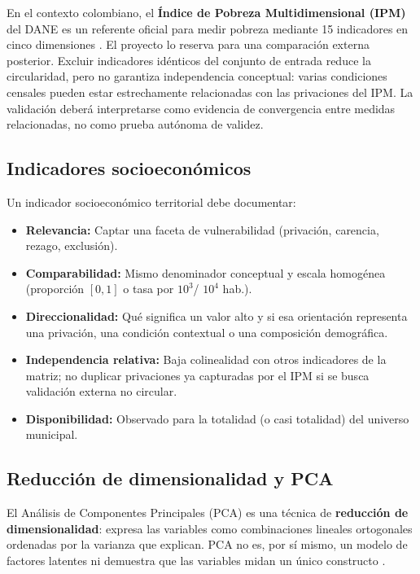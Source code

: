 En el contexto colombiano, el \textbf{Índice de Pobreza Multidimensional (IPM)} del DANE es un referente oficial para medir pobreza mediante 15 indicadores en cinco dimensiones \citep{dane2019ipm}. El proyecto lo reserva para una comparación externa posterior. Excluir indicadores idénticos del conjunto de entrada reduce la circularidad, pero no garantiza independencia conceptual: varias condiciones censales pueden estar estrechamente relacionadas con las privaciones del IPM. La validación deberá interpretarse como evidencia de convergencia entre medidas relacionadas, no como prueba autónoma de validez.

\subsection{Indicadores socioeconómicos}
\label{sec:indicadores_conceptual}

Un indicador socioeconómico territorial debe documentar:

\begin{itemize}
    \item \textbf{Relevancia:} Captar una faceta de vulnerabilidad (privación, carencia, rezago, exclusión).
    \item \textbf{Comparabilidad:} Mismo denominador conceptual y escala homogénea (proporción $[0,1]$ o tasa por $10^3$/ $10^4$ hab.).
    \item \textbf{Direccionalidad:} Qué significa un valor alto y si esa orientación representa una privación, una condición contextual o una composición demográfica.
    \item \textbf{Independencia relativa:} Baja colinealidad con otros indicadores de la matriz; no duplicar privaciones ya capturadas por el IPM si se busca validación externa no circular.
    \item \textbf{Disponibilidad:} Observado para la totalidad (o casi totalidad) del universo municipal.
\end{itemize}

\subsection{Reducción de dimensionalidad y PCA}
\label{sec:pca_conceptual}

El Análisis de Componentes Principales (PCA) es una técnica de \textbf{reducción de dimensionalidad}: expresa las variables como combinaciones lineales ortogonales ordenadas por la varianza que explican. PCA no es, por sí mismo, un modelo de factores latentes ni demuestra que las variables midan un único constructo \citep{jolliffe2002principal, abdi2010principal}.

